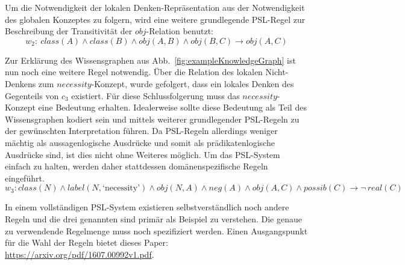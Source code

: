 \documentclass[11pt, a4paper]{scrreprt}
\begin{document}
Um die Notwendigkeit der lokalen Denken-Repräsentation aus der Notwendigkeit des globalen Konzeptes zu folgern, wird eine weitere grundlegende PSL-Regel zur Beschreibung der Transitivität der \(obj\)-Relation benutzt:
\[w_2:\ class(A) \land class(B) \land obj(A, B) \land obj(B, C) \rightarrow obj(A, C)\]

Zur Erklärung des Wissensgraphen aus Abb.~\ref{fig:exampleKnowledgeGraph} ist nun noch eine weitere Regel notwendig.
Über die Relation des lokalen Nicht-Denkens zum \(necessity\)-Konzept, wurde gefolgert, dass ein lokales Denken des Gegenteils von \(c_3\) existiert.
Für diese Schlussfolgerung muss das \(necessity\)-Konzept eine Bedeutung erhalten.
Idealerweise sollte diese Bedeutung als Teil des Wissensgraphen kodiert sein und mittels weiterer grundlegender PSL-Regeln zu der gewünschten Interpretation führen.
Da PSL-Regeln allerdings weniger mächtig als aussagenlogische Ausdrücke und somit als prädikatenlogische Ausdrücke sind, ist dies nicht ohne Weiteres möglich.
Um das PSL-System einfach zu halten, werden daher stattdessen domänenspezifische Regeln eingeführt.
\[w_3: class(N) \land label(N, \text{`necessity'}) \land obj(N, A) \land neg(A) \land obj(A, C) \land possib(C) \rightarrow \lnot \, real(C)\]

In einem vollständigen PSL-System existieren selbstverständlich noch andere Regeln und die drei genannten sind primär als Beispiel zu verstehen.
Die genaue zu verwendende Regelmenge muss noch spezifiziert werden.
Einen Ausgangspunkt für die Wahl der Regeln bietet dieses Paper: \url{https://arxiv.org/pdf/1607.00992v1.pdf}.
\end{document}
